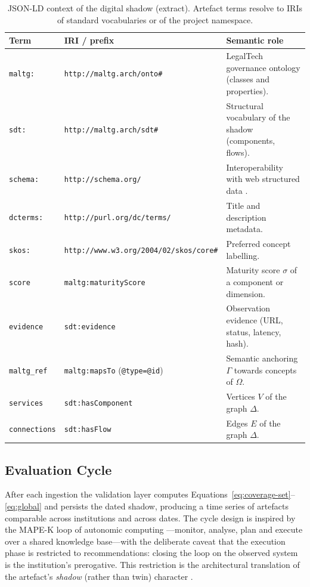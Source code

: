 \documentclass[engproc,article,submit,moreauthors]{Definitions/mdpi}
\begin{document}
\begin{table}[H]
\small
\caption{JSON-LD context of the digital shadow (extract). Artefact terms resolve to IRIs of standard vocabularies or of the project namespace.\label{tab:context}}
\begin{tabularx}{\textwidth}{llX}
\toprule
\textbf{Term} & \textbf{IRI / prefix} & \textbf{Semantic role}\\
\midrule
\texttt{maltg:} & \texttt{http://maltg.arch/onto\#} & LegalTech governance ontology (classes and properties).\\
\texttt{sdt:} & \texttt{http://maltg.arch/sdt\#} & Structural vocabulary of the shadow (components, flows).\\
\texttt{schema:} & \texttt{http://schema.org/} & Interoperability with web structured data \cite{Guha2016}.\\
\texttt{dcterms:} & \texttt{http://purl.org/dc/terms/} & Title and description metadata.\\
\texttt{skos:} & \texttt{http://www.w3.org/2004/02/skos/core\#} & Preferred concept labelling.\\
\texttt{score} & \texttt{maltg:maturityScore} & Maturity score $\sigma$ of a component or dimension.\\
\texttt{evidence} & \texttt{sdt:evidence} & Observation evidence (URL, status, latency, hash).\\
\texttt{maltg\_ref} & \texttt{maltg:mapsTo} (\texttt{@type=@id}) & Semantic anchoring $\Gamma$ towards concepts of $\Omega$.\\
\texttt{services} & \texttt{sdt:hasComponent} & Vertices $V$ of the graph $\Delta$.\\
\texttt{connections} & \texttt{sdt:hasFlow} & Edges $E$ of the graph $\Delta$.\\
\bottomrule
\end{tabularx}
\end{table}

\subsection{Evaluation Cycle}
After each ingestion the validation layer computes Equations~\eqref{eq:coverage-set}--\eqref{eq:global} and persists the dated shadow, producing a time series of artefacts comparable across institutions and across dates. The cycle design is inspired by the MAPE-K loop of autonomic computing \cite{Kephart2003}---monitor, analyse, plan and execute over a shared knowledge base---with the deliberate caveat that the execution phase is restricted to recommendations: closing the loop on the observed system is the institution's prerogative. This restriction is the architectural translation of the artefact's \emph{shadow} (rather than twin) character \cite{Kritzinger2018,Sepasgozar2021}.
\end{document}
